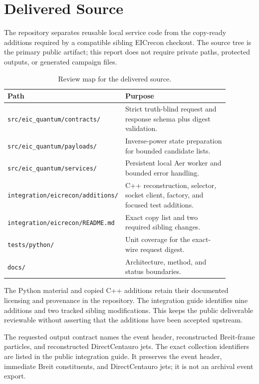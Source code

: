 \section{Delivered Source}
The repository separates reusable local service code from the copy-ready additions required by a compatible sibling EICrecon checkout. The source tree is the primary public artifact; this report does not require private paths, protected outputs, or generated campaign files.

\begin{table}[htbp]\centering\small
\caption{Review map for the delivered source.}\begin{tabular}{L{0.36\linewidth}L{0.52\linewidth}}\toprule
Path & Purpose\\\midrule
\texttt{src/eic\_quantum/contracts/} & Strict truth-blind request and response schema plus digest validation.\\
\texttt{src/eic\_quantum/payloads/} & Inverse-power state preparation for bounded candidate lists.\\
\texttt{src/eic\_quantum/services/} & Persistent local Aer worker and bounded error handling.\\
\texttt{integration/eicrecon/additions/} & C++ reconstruction, selector, socket client, factory, and focused test additions.\\
\texttt{integration/eicrecon/README.md} & Exact copy list and two required sibling changes.\\
\texttt{tests/python/} & Unit coverage for the exact-wire request digest.\\
\texttt{docs/} & Architecture, method, and status boundaries.\\\bottomrule
\end{tabular}\end{table}

The Python material and copied C++ additions retain their documented licensing and provenance in the repository. The integration guide identifies nine additions and two tracked sibling modifications. This keeps the public deliverable reviewable without asserting that the additions have been accepted upstream.

\measured The requested output contract names the event header, reconstructed Breit-frame particles, and reconstructed DirectCentauro jets. The exact collection identifiers are listed in the public integration guide. It preserves the event header, immediate Breit constituents, and DirectCentauro jets; it is not an archival event export.
\clearpage
